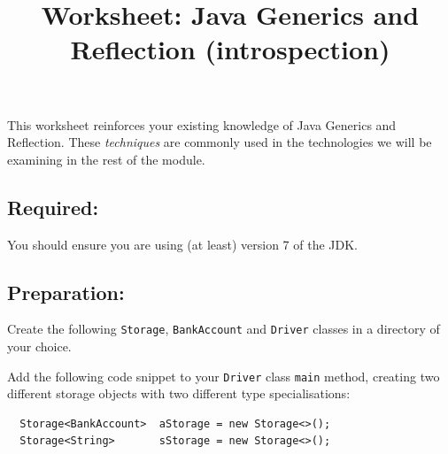 \documentclass[11pt,a4paper]{exam}
\title{Worksheet: Java Generics and Reflection (introspection)}
\author{}
\date{}
\begin{document}
\maketitle

This worksheet reinforces your existing knowledge of Java Generics and Reflection. These \emph{techniques} are
commonly used in the technologies we will be examining in the rest of the module. 

\subsection*{Required:}

You should ensure you are using (at least) version 7 of the JDK.

\subsection*{Preparation:}

Create the following \texttt{Storage}, \texttt{BankAccount} and \texttt{Driver} classes in a directory of your choice.


Add the following code snippet to your \texttt{Driver} class \texttt{main} method, 
creating two different storage
objects with two different type specialisations:

\begin{Verbatim}
  Storage<BankAccount>  aStorage = new Storage<>();
  Storage<String>       sStorage = new Storage<>();
\end{Verbatim}
\end{document}
